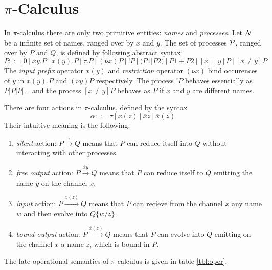 \documentclass[12pt]{article}
\begin{document}
\section{$\pi$-Calculus}
In $\pi$-calculus \cite{PiCalc} there are only two primitive entities: {\it names} and {\it processes}. Let ${\cal N}$ be a infinite set of names, ranged over by $x$ and $y$. The set of processes ${\cal P}$, ranged over by $P$ and $Q$, is defined by following abstract syntax:
\[ P ::= 0 \> | \> \overline{x}y.P \> | \> x(y).P \> | \> \tau.P \> | \> (\nu x)P \> | \> !P \> | \> (P1|P2) \> | \> P1+P2 \> |\> [x=y]P \> | \> [x \neq y] P\]
The {\it input prefix} operator $x(y)$ and {\it restriction} operator $(\nu x)$ bind occurences of $y$ in $x(y).P$ and $(\nu y)P$ respectively. The process $!P$ behaves essentially as $P|P|P|\dots$ and the process $[x \neq y]P$ behaves as $P$ if $x$ and $y$ are different names.
\par There are four actions in $\pi$-calculus, defined by the syntax \[ \alpha ::= \tau \> | \> x(z)\> | \> \overline{x}z \> | \> \overline{x}(z) \] Their intuitive meaning is the following:
\begin{enumerate}
\item {\it silent} action: $P \stackrel{\tau}{\longrightarrow} Q$ means that $P$ can reduce itself into $Q$ without interacting with other processes.
\item {\it free output} action: $P \stackrel{\overline{x}y}{\longrightarrow} Q$ means that $P$ can reduce itself to $Q$ emitting the name $y$ on the channel $x$.
\item {\it input} action: $P \stackrel{x(z)}{\longrightarrow} Q$ means that $P$ can recieve from the channel $x$ any name $w$ and then evolve into $Q\{w/z\}$.
\item {\it bound output} action: $P \stackrel{\overline{x}(z)}{\longrightarrow} Q$ means that $P$ can evolve into $Q$ emitting on the channel $x$ a name $z$, which is bound in $P$.
\end{enumerate}
\par The late operational semantics \cite{Honsell} of $\pi$-calculus is given in table \ref{tbl:oper}.
\end{document}
